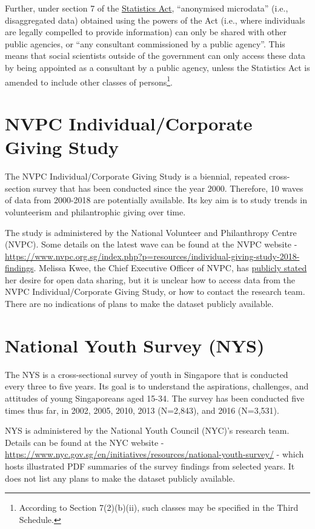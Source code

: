 \documentclass[openany]{book}
\let\rmarkdownfootnote\footnote%
\def\footnote{\protect\rmarkdownfootnote}
\begin{document}
Further, under section 7 of the
\href{https://sso.agc.gov.sg/Act/SA1973}{Statistics Act}, ``anonymised
microdata'' (i.e., disaggregated data) obtained using the powers of the
Act (i.e., where individuals are legally compelled to provide
information) can only be shared with other public agencies, or ``any
consultant commissioned by a public agency''. This means that social
scientists outside of the government can only access these data by being
appointed as a consultant by a public agency, unless the Statistics Act
is amended to include other classes of persons\footnote{According to
  Section 7(2)(b)(ii), such classes may be specified in the Third
  Schedule.}.

\section{NVPC Individual/Corporate Giving Study}\label{nvpc-igs}

The NVPC Individual/Corporate Giving Study is a biennial, repeated
cross-section survey that has been conducted since the year 2000.
Therefore, 10 waves of data from 2000-2018 are potentially available.
Its key aim is to study trends in volunteerism and philantrophic giving
over time.

The study is administered by the National Volunteer and Philanthropy
Centre (NVPC). Some details on the latest wave can be found at the NVPC
website -
\url{https://www.nvpc.org.sg/index.php?p=resources/individual-giving-study-2018-findings}.
Melissa Kwee, the Chief Executive Officer of NVPC, has
\href{https://www.todayonline.com/commentary/keeping-passion-alive-trying-change-world}{publicly
stated} her desire for open data sharing, but it is unclear how to
access data from the NVPC Individual/Corporate Giving Study, or how to
contact the research team. There are no indications of plans to make the
dataset publicly available.

\section{National Youth Survey (NYS)}\label{nys}

The NYS is a cross-sectional survey of youth in Singapore that is
conducted every three to five years. Its goal is to understand the
aspirations, challenges, and attitudes of young Singaporeans aged 15-34.
The survey has been conducted five times thus far, in 2002, 2005, 2010,
2013 (N=2,843), and 2016 (N=3,531).

NYS is administered by the National Youth Council (NYC)'s research team.
Details can be found at the NYC website -
\url{https://www.nyc.gov.sg/en/initiatives/resources/national-youth-survey/}
- which hosts illustrated PDF summaries of the survey findings from
selected years. It does not list any plans to make the dataset publicly
available.
\end{document}

